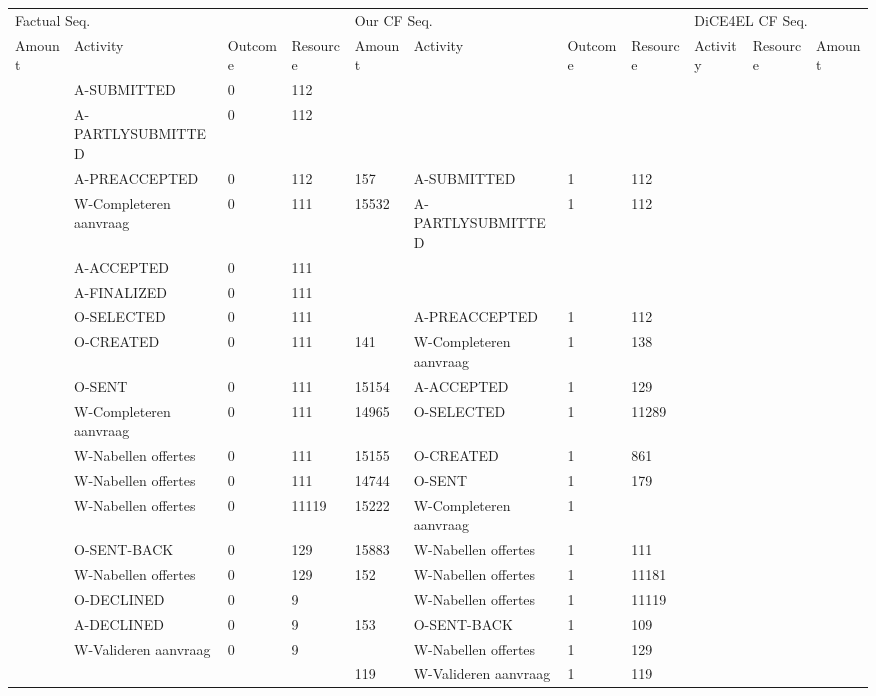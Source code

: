 \begin{tabular}{lllllllllll}
\toprule
\multicolumn{4}{l}{Factual Seq.} & \multicolumn{4}{l}{Our CF Seq.} & \multicolumn{3}{l}{DiCE4EL CF Seq.} \\
Amount & Activity & Outcome & Resource & Amount & Activity & Outcome & Resource & Activity & Resource & Amount \\
\midrule
 & A-SUBMITTED & 0 & 112 &  &  &  &  &  &  &  \\
 & A-PARTLYSUBMITTED & 0 & 112 &  &  &  &  &  &  &  \\
 & A-PREACCEPTED & 0 & 112 & 157 & A-SUBMITTED & 1 & 112 &  &  &  \\
 & W-Completeren aanvraag & 0 & 111 & 15532 & A-PARTLYSUBMITTED & 1 & 112 &  &  &  \\
 & A-ACCEPTED & 0 & 111 &  &  &  &  &  &  &  \\
 & A-FINALIZED & 0 & 111 &  &  &  &  &  &  &  \\
 & O-SELECTED & 0 & 111 &  & A-PREACCEPTED & 1 & 112 &  &  &  \\
 & O-CREATED & 0 & 111 & 141 & W-Completeren aanvraag & 1 & 138 &  &  &  \\
 & O-SENT & 0 & 111 & 15154 & A-ACCEPTED & 1 & 129 &  &  &  \\
 & W-Completeren aanvraag & 0 & 111 & 14965 & O-SELECTED & 1 & 11289 &  &  &  \\
 & W-Nabellen offertes & 0 & 111 & 15155 & O-CREATED & 1 & 861 &  &  &  \\
 & W-Nabellen offertes & 0 & 111 & 14744 & O-SENT & 1 & 179 &  &  &  \\
 & W-Nabellen offertes & 0 & 11119 & 15222 & W-Completeren aanvraag & 1 &  &  &  &  \\
 & O-SENT-BACK & 0 & 129 & 15883 & W-Nabellen offertes & 1 & 111 &  &  &  \\
 & W-Nabellen offertes & 0 & 129 & 152 & W-Nabellen offertes & 1 & 11181 &  &  &  \\
 & O-DECLINED & 0 & 9 &  & W-Nabellen offertes & 1 & 11119 &  &  &  \\
 & A-DECLINED & 0 & 9 & 153 & O-SENT-BACK & 1 & 109 &  &  &  \\
 & W-Valideren aanvraag & 0 & 9 &  & W-Nabellen offertes & 1 & 129 &  &  &  \\
 &  &  &  & 119 & W-Valideren aanvraag & 1 & 119 &  &  &  \\
\bottomrule
\end{tabular}
